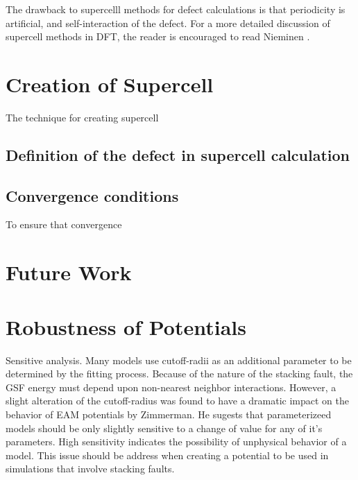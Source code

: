 The drawback to supercelll methods for defect calculations is that periodicity is artificial, and self-interaction of the defect.
For a more detailed discussion of supercell methods in DFT, the reader is encouraged to read Nieminen \cite{nieminen2007supercell}.
\section{Creation of Supercell}
The technique for creating supercell
\subsection{Definition of the defect in supercell calculation}

\subsection{Convergence conditions}
To ensure that convergence
\section{Future Work}

\section{Robustness of Potentials}
Sensitive analysis.  Many models use cutoff-radii as an additional parameter to be determined by the fitting process.  Because of the nature of the stacking fault, the GSF energy must depend upon non-nearest neighbor interactions.
However, a slight alteration of the cutoff-radius was found to have a dramatic impact on the behavior of EAM potentials by Zimmerman.%
He sugests that parameterizeed models should be only slightly sensitive to a change of value for any of it's parameters.  High sensitivity indicates the possibility of unphysical behavior of a model.  This issue should be address when creating a potential to be used in simulations that involve stacking faults.
